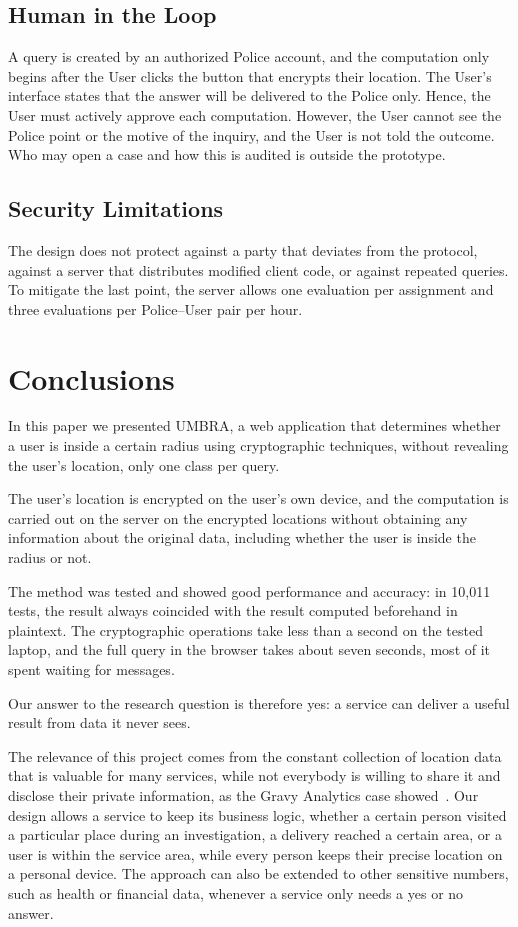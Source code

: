 \documentclass[conference,letterpaper]{IEEEtran}
\begin{document}
\subsection{Human in the Loop}
A query is created by an authorized Police account, and the computation only begins after the User clicks the button that encrypts their location. The User's interface states that the answer will be delivered to the Police only. Hence, the User must actively approve each computation. However, the User cannot see the Police point or the motive of the inquiry, and the User is not told the outcome. Who may open a case and how this is audited is outside the prototype.

\subsection{Security Limitations}
The design does not protect against a party that deviates from the protocol, against a server that distributes modified client code, or against repeated queries. To mitigate the last point, the server allows one evaluation per assignment and three evaluations per Police--User pair per hour.

\section{Conclusions}\label{sec:concl}
In this paper we presented UMBRA, a web application that determines whether a user is inside a certain radius using cryptographic techniques, without revealing the user's location, only one class per query.

The user's location is encrypted on the user's own device, and the computation is carried out on the server on the encrypted locations without obtaining any information about the original data, including whether the user is inside the radius or not.

The method was tested and showed good performance and accuracy: in 10,011 tests, the result always coincided with the result computed beforehand in plaintext. The cryptographic operations take less than a second on the tested laptop, and the full query in the browser takes about seven seconds, most of it spent waiting for messages.

Our answer to the research question is therefore yes: a service can deliver a useful result from data it never sees.

The relevance of this project comes from the constant collection of location data that is valuable for many services, while not everybody is willing to share it and disclose their private information, as the Gravy Analytics case showed~\cite{ftc,tc}. Our design allows a service to keep its business logic, whether a certain person visited a particular place during an investigation, a delivery reached a certain area, or a user is within the service area, while every person keeps their precise location on a personal device. The approach can also be extended to other sensitive numbers, such as health or financial data, whenever a service only needs a yes or no answer.
\end{document}
